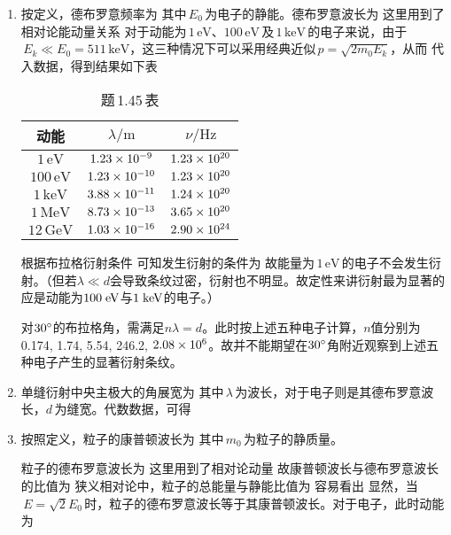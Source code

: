 \begin{enumerate}[label=1.\arabic*, leftmargin=-0.5mm]
\item
按定义，德布罗意频率为
其中$\,E_0\,$为电子的静能。德布罗意波长为
这里用到了相对论能动量关系
对于动能为$\,1\,\mathrm{eV}$、$100\,\mathrm{eV}\,$及$\,1\,\mathrm{keV}\,$的电子来说，由于$\,E_k\ll E_0=511\,\mathrm{keV}$，这三种情况下可以采用经典近似$\,p=\sqrt{2m_0E_k}$，从而
代入数据，得到结果如下表
\begin{table}[h]
    \centering
    \begin{tabular}{c|c|c}
    \hline
        \rule{0pt}{13pt}动能 & $\lambda/\mathrm{m}$ & $\nu/\mathrm{Hz}$ \\
        \hline
        \rule{0pt}{13pt}$1\,\mathrm{eV}$ & $1.23\times10^{-9}$ & $1.23\times10^{20}$ \\
        $100\,\mathrm{eV}$ & $1.23\times10^{-10}$ & $1.23\times10^{20}$ \\
        $1\,\mathrm{keV}$ & $3.88\times10^{-11}$ & $1.24\times10^{20}$ \\
        $1\,\mathrm{MeV}$ & $8.73\times10^{-13}$ & $3.65\times10^{20}$ \\
        $12\,\mathrm{GeV}$ & $1.03\times10^{-16}$ & $2.90\times10^{24}$ \\
    \hline
    \end{tabular}
    \caption{题\,1.45\,表}
\end{table}\par
根据布拉格衍射条件
可知发生衍射的条件为
故能量为$\,1\,\mathrm{eV}\,$的电子不会发生衍射。（但若$\lambda \ll d$会导致条纹过密，衍射也不明显。故定性来讲衍射最为显著的应是动能为$100\;\mathrm{eV}$与$1\;\mathrm{keV}$的电子。）

对$30^\circ$的布拉格角，需满足$n\lambda = d$。此时按上述五种电子计算，$n$值分别为 0.174, 1.74, 5.54, 246.2, $2.08\times 10^{6}$。故并不能期望在$30^\circ$角附近观察到上述五种电子产生的显著衍射条纹。

\item
单缝衍射中央主极大的角展宽为
其中$\,\lambda\,$为波长，对于电子则是其德布罗意波长，$d\,$为缝宽。代数数据，可得

\item
按照定义，粒子的康普顿波长为
其中$\,m_0\,$为粒子的静质量。\par
粒子的德布罗意波长为
这里用到了相对论动量
故康普顿波长与德布罗意波长的比值为
狭义相对论中，粒子的总能量与静能比值为
容易看出
显然，当$\,E=\sqrt{2}E_0\,$时，粒子的德布罗意波长等于其康普顿波长。对于电子，此时动能为


\end{enumerate}
